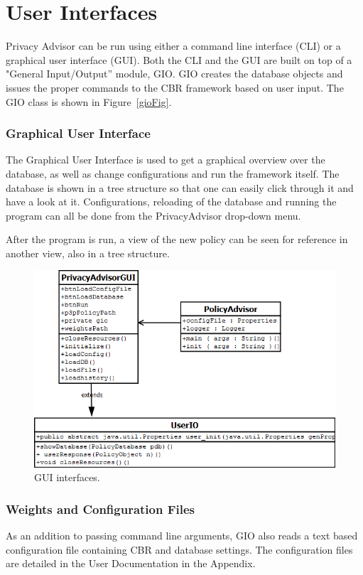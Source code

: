 \section{User Interfaces}
Privacy Advisor can be run using either a command line interface (CLI) or a graphical user interface (GUI). Both the CLI and the GUI are built on top of a "General Input/Output'' module, GIO. GIO creates the database objects and issues the proper commands to the CBR framework based on user input. The GIO class is shown in Figure~\ref{gioFig}. 


\subsubsection{Graphical User Interface} 
The Graphical User Interface is used to get a graphical overview over the database, as well as change configurations and run the framework itself. The database is shown in a tree structure so that one can easily click through it and have a look at it. Configurations, reloading of the database and running the program can all be done from the PrivacyAdvisor drop-down menu.

After the program is run, a view of the new policy can be seen for reference in another view, also in a tree structure.

\begin{figure}[htbp]
\begin{center}
\includegraphics[width = \textwidth]{DesignReport/uml/policyadvisorgui}
\caption{GUI interfaces.}
\label{GUI_interface}
\end{center}
\end{figure}

\subsubsection{Weights and Configuration Files}
As an addition to passing command line arguments, GIO also reads a text based configuration file containing CBR and database settings. The configuration files are detailed in the User Documentation in the Appendix. 